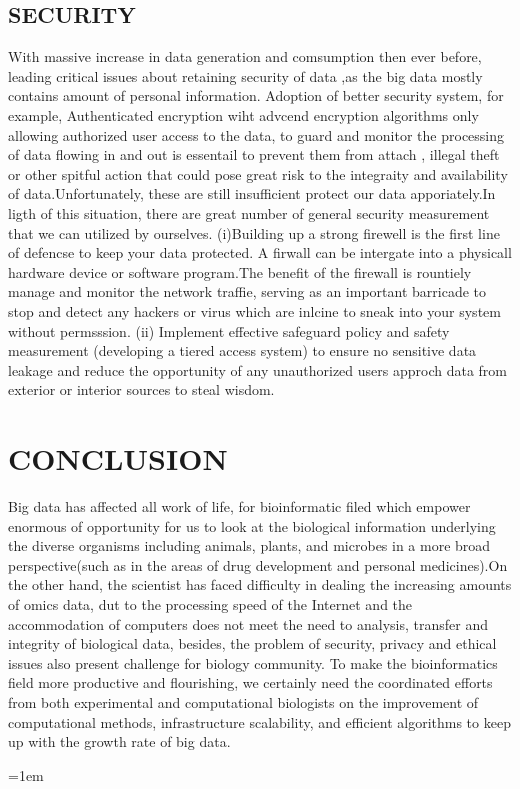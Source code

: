 \documentclass[12pt]{article}
\begin{document}
\subsection{SECURITY}
With massive increase in data generation and comsumption then ever before, leading critical issues about retaining security of data ,as the big data mostly contains amount of personal information. Adoption of better security system, for example, Authenticated encryption wiht advcend encryption algorithms only allowing authorized user access to the data, to guard and monitor the processing of data flowing in and out is essentail to prevent them from attach , illegal theft or other spitful action that could pose great risk to the integraity and availability of data.Unfortunately, these are still insufficient protect our data apporiately.In ligth of this situation, there are great number of general security measurement that we can utilized by ourselves.
(i)Building up a strong firewell is the first line of defencse to keep your data protected. A firwall can be intergate into a physicall hardware device or software program.The benefit of the firewall is rountiely manage and monitor the network traffie, serving as an important barricade to stop and detect any hackers or virus which are inlcine to sneak into your system without permsssion.
(ii) Implement effective safeguard policy and safety measurement (developing a tiered access system) to ensure no sensitive data leakage and reduce the opportunity of any unauthorized users approch data from exterior or interior sources to steal wisdom.

 
\section{CONCLUSION}
Big data has affected all work of life, for bioinformatic filed which empower enormous of opportunity for us to look at the biological information underlying the diverse organisms including animals, plants, and microbes in a  more broad perspective(such as in the areas of drug development and personal medicines).On the other hand, the scientist has faced difficulty in dealing the increasing amounts of omics data, dut to the processing speed of the Internet and the accommodation of computers does not meet the need to analysis, transfer and integrity of biological data, besides, the problem of security, privacy and ethical issues also present challenge for biology community. To make the bioinformatics field more productive and flourishing, we certainly need the coordinated efforts from both experimental and computational biologists on the improvement of computational methods, infrastructure scalability, and efficient algorithms to keep up with the growth rate of big data.

\medskip


\emergencystretch=1em
\printbibliography[title=Reference]
\end{document}
